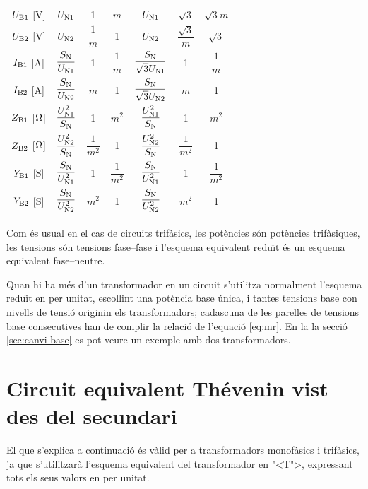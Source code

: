 \begin{longtable}{ccccccc}
$U\ped{B1}$ [V] & $U\ped{N1}$ & 1 & $m$ & $U\ped{N1}$ & $\sqrt{3}$  & $\sqrt{3} m$\\[0.4cm]
$U\ped{B2}$ [V] & $U\ped{N2}$ & $\dfrac{1}{m}$ & 1 & $U\ped{N2}$ & $\dfrac{\sqrt{3}}{m}$ & $\sqrt{3}$ \\[0.4cm]
$I\ped{B1}$ [A] & $\dfrac{S\ped{N}}{U\ped{N1}}$ & 1 & $\dfrac{1}{m}$ & $\dfrac{S\ped{N}}{\sqrt{3}U\ped{N1}}$ & 1  & $\dfrac{1}{m}$\\[0.4cm]
$I\ped{B2}$ [A] & $\dfrac{S\ped{N}}{U\ped{N2}}$  & $m$ & 1 & $\dfrac{S\ped{N}}{\sqrt{3}U\ped{N2}}$   & $m$ & 1\\[0.4cm]
$Z\ped{B1}$ [$\ohm$]& $\dfrac{U\ped{N1}^2}{S\ped{N}}$ & 1 & $m^2$ & $\dfrac{U\ped{N1}^2}{S\ped{N}}$ & 1 & $m^2$\\[0.4cm]
$Z\ped{B2}$ [$\ohm$]& $\dfrac{U\ped{N2}^2}{S\ped{N}}$  & $\dfrac{1}{m^2}$ & 1& $\dfrac{U\ped{N2}^2}{S\ped{N}}$  & $\dfrac{1}{m^2}$ & 1\\[0.4cm]
$Y\ped{B1}$ [S]& $\dfrac{S\ped{N}}{U\ped{N1}^2}$ & 1 & $\dfrac{1}{m^2}$ & $\dfrac{S\ped{N}}{U\ped{N1}^2}$ & 1 & $\dfrac{1}{m^2}$ \\[0.4cm]
$Y\ped{B2}$ [S]& $\dfrac{S\ped{N}}{U\ped{N2}^2}$  & $m^2$ & 1 & $\dfrac{S\ped{N}}{U\ped{N2}^2}$ &$m^2$ &  1\\[0.4cm]
\bottomrule[1pt]
\end{longtable}

Com \'{e}s usual en el cas de circuits trif\`{a}sics, les pot\`{e}ncies s\'{o}n  pot\`{e}ncies trif\`{a}siques,  les tensions s\'{o}n  tensions fase--fase i l'esquema equivalent redu\"{\i}t \'{e}s un esquema equivalent fase--neutre.

Quan hi ha m\'{e}s d'un transformador en un circuit s'utilitza normalment l'esquema redu\"{\i}t en per unitat, escollint una pot\`{e}ncia base \'{u}nica, i tantes tensions base con nivells de tensi\'{o}  originin els transformadors; cadascuna de les parelles de tensions base consecutives han de complir la relaci\'{o} de l'equaci\'{o} \eqref{eq:mr}. En la la secci\'{o} \vref{sec:canvi-base} es pot veure un exemple amb dos transformadors.

\section{Circuit equivalent Th\'{e}venin vist des del secundari}\label{sec:trafo-thevenin}

El que s'explica a continuaci\'{o} \'{e}s v\`{a}lid per a transformadors
monof\`{a}sics i trif\`{a}sics, ja que s'utilitzar\`{a} l'esquema equivalent del
transformador en {"<}T{">}, expressant tots els seus valors en per unitat.

